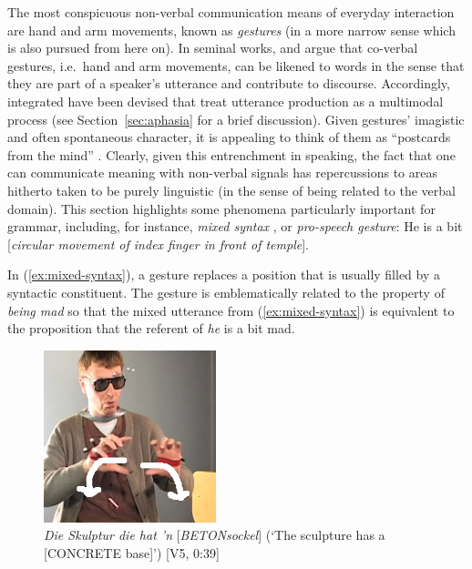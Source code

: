 \documentclass[output=paper]{langsci/langscibook}
\begin{document}
The most conspicuous non-verbal communication means of everyday interaction are hand and arm movements, known as \emph{gestures} (in a more narrow sense which is also pursued from here on).
%
In seminal works, \citet{McNeill:1985,McNeill:1992} and \citet{Kendon:1980,Kendon:2004} argue that co-verbal gestures, i.e.\ hand and arm movements, can be likened to words in the sense that they are part of a speaker's utterance and contribute to discourse.
%
Accordingly, integrated  have been devised \citep{Kita:Ozyurek:2003,de:Ruiter:2000,Krauss:Chen:Gottesmann:2000} that treat utterance production as a multimodal process (see Section~\ref{sec:aphasia} for a brief discussion).
%
Given gestures' imagistic  and often spontaneous character, it is appealing to think of them as \enquote{postcards from the mind} \citep[21]{de:Ruiter:2007:a}.
%
Clearly, given this entrenchment in speaking, the fact that one can communicate meaning with non-verbal signals has repercussions to areas hitherto taken to be purely linguistic (in the sense of being related to the verbal domain).
%
This section highlights some phenomena particularly important for grammar, including, for instance,  \emph{mixed syntax}  \citep{Slama-Cazacu:1976}, or \emph{pro-speech gesture}: 
%
\ea \label{ex:mixed-syntax}
He is a bit [\textit{circular movement of index finger in front of temple}].
\z

In (\ref{ex:mixed-syntax}), a gesture replaces a position that is usually filled by a syntactic constituent.
%
The gesture is emblematically related to the property of \textit{being mad} so that the mixed utterance from (\ref{ex:mixed-syntax}) is equivalent to the proposition that the referent of \textit{he} is a bit mad.

\begin{figure}
  \centering
  \includegraphics[trim={0 0 0 4cm}, clip, width=5cm]{figures/Betonsockel-1}
  \caption[Sculpture]{\textit{Die Skulptur die hat 'n} [\textit{BETONsockel}] (\enquote*{The sculpture has a [CONCRETE base]}) [V5, 0:39]}
  \label{fig:betonsockel}
\end{figure}
\end{document}
